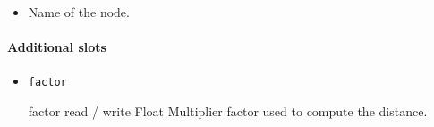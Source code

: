 \begin{itemize}
\item {} Name of the \webots node.
\end{itemize}

\paragraph{Additional slots}

\begin{itemize}
\item \lstinline|factor|
\begin{attribute}{factor}
  {read / write}
  {Float}
  {}
  Multiplier factor used to compute the distance.
\end{attribute}
\end{itemize}








